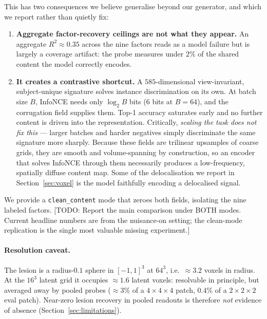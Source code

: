 \documentclass[11pt]{article}
\newcommand{\todo}[1]{{\color{blue}\small[TODO: #1]}}
\begin{document}
This has two consequences we believe generalise beyond our generator, and which
we report rather than quietly fix:

\begin{enumerate}
\item \textbf{Aggregate factor-recovery ceilings are not what they appear.} An
aggregate $R^2 \approx 0.35$ across the nine factors reads as a model failure
but is largely a coverage artifact: the probe measures under $2\%$ of the shared
content the model correctly encodes.
\item \textbf{It creates a contrastive shortcut.} A $585$-dimensional
view-invariant, subject-unique signature solves instance discrimination on its
own. At batch size $B$, InfoNCE needs only $\log_2 B$ bits ($6$ bits at
$B{=}64$), and the corrugation field supplies them. Top-1 accuracy saturates
early and no further content is driven into the representation. Critically,
\emph{scaling the task does not fix this} --- larger batches and harder
negatives simply discriminate the same signature more sharply. Because these
fields are trilinear upsamples of coarse grids, they are smooth and
volume-spanning by construction, so an encoder that solves InfoNCE through them
necessarily produces a low-frequency, spatially diffuse content map. Some of the
delocalisation we report in Section~\ref{sec:voxel} is the model faithfully
encoding a delocalised signal.
\end{enumerate}

We provide a \texttt{clean\_content} mode that zeroes both fields, isolating the
nine labeled factors. \todo{Report the main comparison under BOTH modes. Current
headline numbers are from the nuisance-on setting; the clean-mode replication is
the single most valuable missing experiment.}

\paragraph{Resolution caveat.} The lesion is a radius-$0.1$ sphere in
$[-1,1]^3$ at $64^3$, i.e.\ $\approx\!3.2$ voxels in radius. At the $16^3$
latent grid it occupies $\approx\!1.6$ latent voxels: resolvable in principle,
but averaged away by pooled probes ($\approx\!3\%$ of a $4{\times}4{\times}4$
patch, $0.4\%$ of a $2{\times}2{\times}2$ eval patch). Near-zero lesion recovery
in pooled readouts is therefore \emph{not} evidence of absence
(Section~\ref{sec:limitations}).

\end{document}
